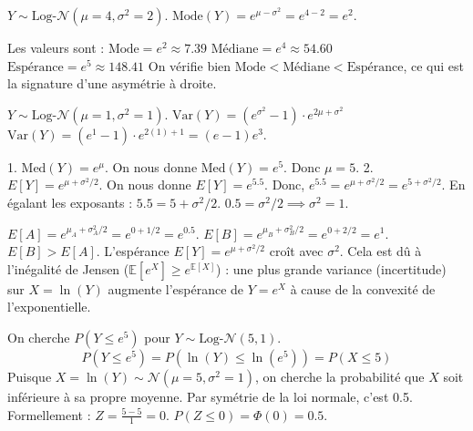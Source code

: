 \begin{correctionbox}
$Y \sim \text{Log-}\mathcal{N}(\mu=4, \sigma^2=2)$.
$\text{Mode}(Y) = e^{\mu - \sigma^2} = e^{4 - 2} = e^2$.
\end{correctionbox}

\begin{correctionbox}
Les valeurs sont :
$\text{Mode} = e^2 \approx 7.39$
$\text{Médiane} = e^4 \approx 54.60$
$\text{Espérance} = e^5 \approx 148.41$
On vérifie bien $\text{Mode} < \text{Médiane} < \text{Espérance}$, ce qui est la signature d'une asymétrie à droite.
\end{correctionbox}

\begin{correctionbox}
$Y \sim \text{Log-}\mathcal{N}(\mu=1, \sigma^2=1)$.
$\text{Var}(Y) = (e^{\sigma^2} - 1) \cdot e^{2\mu + \sigma^2}$
$\text{Var}(Y) = (e^{1} - 1) \cdot e^{2(1) + 1} = (e - 1)e^3$.
\end{correctionbox}

\begin{correctionbox}
1.  $\text{Med}(Y) = e^{\mu}$. On nous donne $\text{Med}(Y) = e^5$. Donc $\mu = 5$.
2.  $E[Y] = e^{\mu + \sigma^2/2}$. On nous donne $E[Y] = e^{5.5}$.
    Donc, $e^{5.5} = e^{\mu + \sigma^2/2} = e^{5 + \sigma^2/2}$.
    En égalant les exposants : $5.5 = 5 + \sigma^2/2$.
    $0.5 = \sigma^2/2 \implies \sigma^2 = 1$.
\end{correctionbox}

\begin{correctionbox}
$E[A] = e^{\mu_A + \sigma_A^2/2} = e^{0 + 1/2} = e^{0.5}$.
$E[B] = e^{\mu_B + \sigma_B^2/2} = e^{0 + 2/2} = e^{1}$.
$E[B] > E[A]$. L'espérance $E[Y] = e^{\mu + \sigma^2/2}$ croît avec $\sigma^2$. Cela est dû à l'inégalité de Jensen ($\mathbb{E}[e^X] \geq e^{\mathbb{E}[X]}$) : une plus grande variance (incertitude) sur $X=\ln(Y)$ augmente l'espérance de $Y=e^X$ à cause de la convexité de l'exponentielle.
\end{correctionbox}

\begin{correctionbox}
On cherche $P(Y \le e^5)$ pour $Y \sim \text{Log-}\mathcal{N}(5, 1)$.
$$P(Y \le e^5) = P(\ln(Y) \le \ln(e^5)) = P(X \le 5)$$
Puisque $X = \ln(Y) \sim \mathcal{N}(\mu=5, \sigma^2=1)$, on cherche la probabilité que $X$ soit inférieure à sa propre moyenne. Par symétrie de la loi normale, c'est 0.5.
Formellement : $Z = \frac{5 - 5}{1} = 0$. $P(Z \le 0) = \Phi(0) = 0.5$.
\end{correctionbox}

